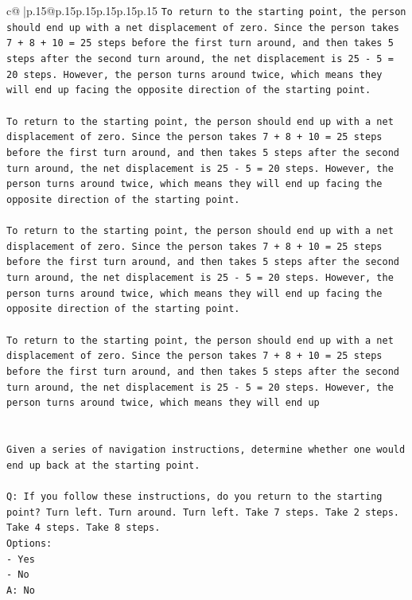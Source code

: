 \documentclass{article}
\begin{document}
{\begin{supertabular}{c@{$\;$}|p{.15\linewidth}@{}p{.15\linewidth}p{.15\linewidth}p{.15\linewidth}p{.15\linewidth}p{.15\linewidth}}
{{{\texttt{To return to the starting point, the person should end up with a net displacement of zero. Since the person takes 7 + 8 + 10 = 25 steps before the first turn around, and then takes 5 steps after the second turn around, the net displacement is 25 {-} 5 = 20 steps. However, the person turns around twice, which means they will end up facing the opposite direction of the starting point. } \\
\\ 
\texttt{To return to the starting point, the person should end up with a net displacement of zero. Since the person takes 7 + 8 + 10 = 25 steps before the first turn around, and then takes 5 steps after the second turn around, the net displacement is 25 {-} 5 = 20 steps. However, the person turns around twice, which means they will end up facing the opposite direction of the starting point. } \\
\\ 
\texttt{To return to the starting point, the person should end up with a net displacement of zero. Since the person takes 7 + 8 + 10 = 25 steps before the first turn around, and then takes 5 steps after the second turn around, the net displacement is 25 {-} 5 = 20 steps. However, the person turns around twice, which means they will end up facing the opposite direction of the starting point. } \\
\\ 
\texttt{To return to the starting point, the person should end up with a net displacement of zero. Since the person takes 7 + 8 + 10 = 25 steps before the first turn around, and then takes 5 steps after the second turn around, the net displacement is 25 {-} 5 = 20 steps. However, the person turns around twice, which means they will end up} \\
\\ 
\\ 
\texttt{Given a series of navigation instructions, determine whether one would end up back at the starting point.} \\
\\ 
\texttt{Q: If you follow these instructions, do you return to the starting point? Turn left. Turn around. Turn left. Take 7 steps. Take 2 steps. Take 4 steps. Take 8 steps.} \\
\texttt{Options:} \\
\texttt{{-} Yes} \\
\texttt{{-} No} \\
\texttt{A: No} \\
\\ 
}}}
\end{supertabular}}
\end{document}
